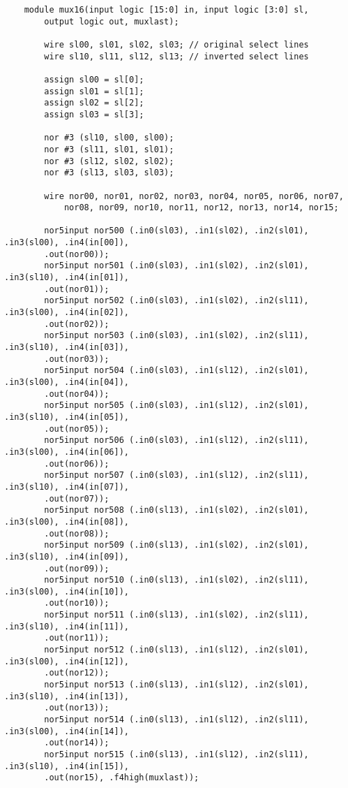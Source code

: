 \documentclass[../main]{subfiles}
\begin{document}
\begin{verbatim}
    module mux16(input logic [15:0] in, input logic [3:0] sl,
        output logic out, muxlast);

        wire sl00, sl01, sl02, sl03; // original select lines
        wire sl10, sl11, sl12, sl13; // inverted select lines

        assign sl00 = sl[0];
        assign sl01 = sl[1];
        assign sl02 = sl[2];
        assign sl03 = sl[3];

        nor #3 (sl10, sl00, sl00);
        nor #3 (sl11, sl01, sl01);
        nor #3 (sl12, sl02, sl02);
        nor #3 (sl13, sl03, sl03);

        wire nor00, nor01, nor02, nor03, nor04, nor05, nor06, nor07,
            nor08, nor09, nor10, nor11, nor12, nor13, nor14, nor15;

        nor5input nor500 (.in0(sl03), .in1(sl02), .in2(sl01), .in3(sl00), .in4(in[00]),
        .out(nor00));
        nor5input nor501 (.in0(sl03), .in1(sl02), .in2(sl01), .in3(sl10), .in4(in[01]),
        .out(nor01));
        nor5input nor502 (.in0(sl03), .in1(sl02), .in2(sl11), .in3(sl00), .in4(in[02]),
        .out(nor02));
        nor5input nor503 (.in0(sl03), .in1(sl02), .in2(sl11), .in3(sl10), .in4(in[03]),
        .out(nor03));
        nor5input nor504 (.in0(sl03), .in1(sl12), .in2(sl01), .in3(sl00), .in4(in[04]),
        .out(nor04));
        nor5input nor505 (.in0(sl03), .in1(sl12), .in2(sl01), .in3(sl10), .in4(in[05]),
        .out(nor05));
        nor5input nor506 (.in0(sl03), .in1(sl12), .in2(sl11), .in3(sl00), .in4(in[06]),
        .out(nor06));
        nor5input nor507 (.in0(sl03), .in1(sl12), .in2(sl11), .in3(sl10), .in4(in[07]),
        .out(nor07));
        nor5input nor508 (.in0(sl13), .in1(sl02), .in2(sl01), .in3(sl00), .in4(in[08]),
        .out(nor08));
        nor5input nor509 (.in0(sl13), .in1(sl02), .in2(sl01), .in3(sl10), .in4(in[09]),
        .out(nor09));
        nor5input nor510 (.in0(sl13), .in1(sl02), .in2(sl11), .in3(sl00), .in4(in[10]),
        .out(nor10));
        nor5input nor511 (.in0(sl13), .in1(sl02), .in2(sl11), .in3(sl10), .in4(in[11]),
        .out(nor11));
        nor5input nor512 (.in0(sl13), .in1(sl12), .in2(sl01), .in3(sl00), .in4(in[12]),
        .out(nor12));
        nor5input nor513 (.in0(sl13), .in1(sl12), .in2(sl01), .in3(sl10), .in4(in[13]),
        .out(nor13));
        nor5input nor514 (.in0(sl13), .in1(sl12), .in2(sl11), .in3(sl00), .in4(in[14]),
        .out(nor14));
        nor5input nor515 (.in0(sl13), .in1(sl12), .in2(sl11), .in3(sl10), .in4(in[15]),
        .out(nor15), .f4high(muxlast));


\end{verbatim}
\end{document}

